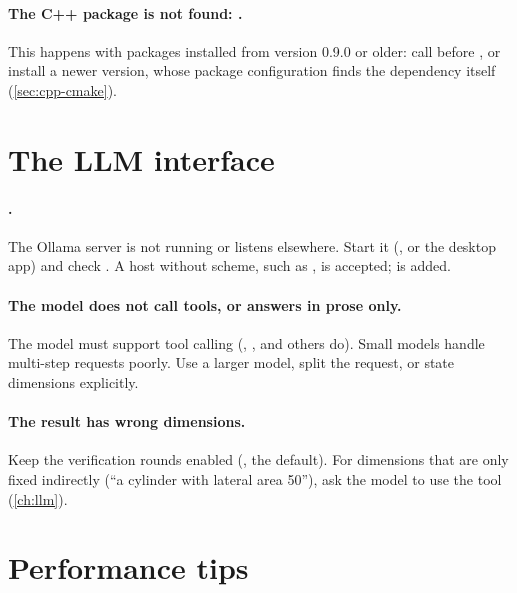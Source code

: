 \paragraph{The C++ package is not found: .}
This happens with packages installed from version 0.9.0 or older: call
 before , or install a newer
version, whose package configuration finds the dependency itself (\cref{sec:cpp-cmake}).

\section{The LLM interface}\label{sec:ts-llm}

\paragraph{.} The Ollama server
is not running or listens elsewhere. Start it (, or the desktop app) and check
. A host without scheme, such as , is accepted;
 is added.

\paragraph{The model does not call tools, or answers in prose only.} The model must support tool
calling (, ,  and others do). Small models
handle multi-step requests poorly. Use a larger model, split the request, or state dimensions
explicitly.

\paragraph{The result has wrong dimensions.} Keep the verification rounds enabled
(, the default). For dimensions that are only fixed indirectly (``a
cylinder with lateral area 50''), ask the model to use the  tool
(\cref{ch:llm}).

\section{Performance tips}\label{sec:ts-performance}

